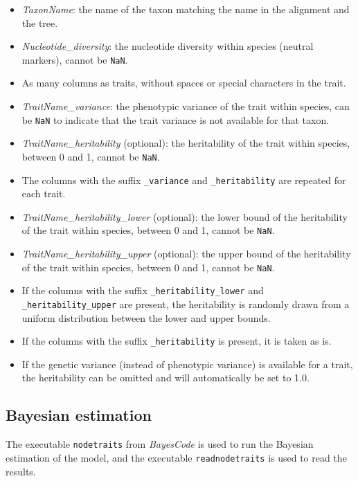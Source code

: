 \documentclass{article}
\begin{document}
\begin{itemize}
    \item \emph{TaxonName}: the name of the taxon matching the name in the alignment and the tree.
    \item \emph{Nucleotide\_diversity}: the nucleotide diversity within species (neutral markers), cannot be \texttt{NaN}.
    \item As many columns as traits, without spaces or special characters in the trait.
    \item \emph{TraitName\_variance}: the phenotypic variance of the trait within species, can be \texttt{NaN} to indicate that the trait variance is not available for that taxon.
    \item \emph{TraitName\_heritability} (optional): the heritability of the trait within species, between 0 and 1, cannot be \texttt{NaN}.
    \item The columns with the suffix \texttt{\_variance} and \texttt{\_heritability} are repeated for each trait.
    \item \emph{TraitName\_heritability\_lower} (optional): the lower bound of the heritability of the trait within species, between 0 and 1, cannot be \texttt{NaN}.
    \item \emph{TraitName\_heritability\_upper} (optional): the upper bound of the heritability of the trait within species, between 0 and 1, cannot be \texttt{NaN}.
    \item If the columns with the suffix \texttt{\_heritability\_lower} and \texttt{\_heritability\_upper} are present, the heritability is randomly drawn from a uniform distribution between the lower and upper bounds.
    \item If the columns with the suffix \texttt{\_heritability} is present, it is taken as is.
    \item If the genetic variance (instead of phenotypic variance) is available for a trait, the heritability can be omitted and will automatically be set to 1.0.
\end{itemize}

\newpage
\subsection{Bayesian estimation}\label{subsec:running-nodetraitsand-readnodetraits}

The executable \texttt{nodetraits} from \textit{BayesCode} is used to run the Bayesian estimation of the model, and the executable \texttt{readnodetraits} is used to read the results.
\end{document}
